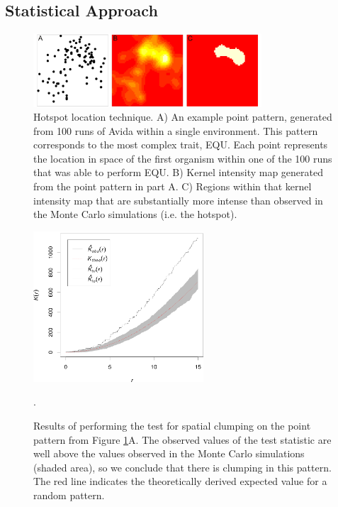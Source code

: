 \subsection{Statistical Approach}

\begin{figure}
\begin{center}
\includegraphics[width=3.35in]{figs/statsfig_horziontal_1col.png}
\caption{Hotspot location technique. A) An example point pattern, generated from 100 runs of Avida within a single environment. This pattern corresponds to the most complex trait, EQU. Each point represents the location in space of the first organism within one of the 100 runs that was able to perform EQU. B) Kernel intensity map generated from the point pattern in part A. C) Regions within that kernel intensity map that are substantially more intense than observed in the Monte Carlo simulations (i.e. the hotspot).}
\label{stats}
\end{center}
\end{figure}
\begin{figure}[t]
\begin{center}
\includegraphics[width=2.5in]{figs/9_50013_k-hat.png}
\caption{Results of performing the test for spatial clumping on the point pattern from Figure \ref{stats}A. The observed values of the test statistic are well above the values observed in the Monte Carlo simulations (shaded area), so we conclude that there is clumping in this pattern. The red line indicates the theoretically derived expected value for a random pattern.}. 
\label{khat}
\end{center}
\end{figure}

